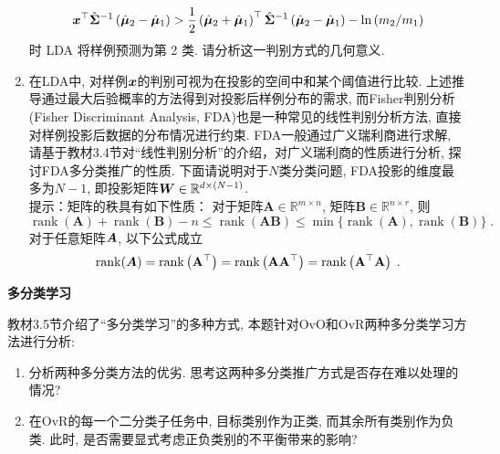 \documentclass[answers]{exam}  %
\begin{document}
\begin{questions}
\begin{enumerate}
          \begin{equation}
            {\boldsymbol{x}}^{\top} \hat{\boldsymbol{\Sigma}}^{-1}\left(\hat{\boldsymbol{\mu}}_{2}-\hat{\boldsymbol{\mu}}_{1}\right)>\frac{1}{2}\left(\hat{\boldsymbol{\mu}}_{2}+\hat{\boldsymbol{\mu}}_{1}\right)^{\top} \hat{\boldsymbol{\Sigma}}^{-1}\left(\hat{\boldsymbol{\mu}}_{2}-\hat{\boldsymbol{\mu}}_{1}\right)-\ln \left(m_{2} / m_{1}\right)
          \end{equation}时 LDA 将样例预测为第 2 类. 请分析这一判别方式的几何意义.
    \item 在LDA中, 对样例${\boldsymbol{x}}$的判别可视为在投影的空间中和某个阈值进行比较. 上述推导通过最大后验概率的方法得到对投影后样例分布的需求, 而Fisher判别分析 (Fisher Discriminant Analysis, FDA)也是一种常见的线性判别分析方法, 直接对样例投影后数据的分布情况进行约束.
          FDA一般通过广义瑞利商进行求解, 请基于教材3.4节对“线性判别分析”的介绍，对广义瑞利商的性质进行分析, 探讨FDA多分类推广的性质.
          下面请说明对于$N$类分类问题, FDA投影的维度最多为$N-1$, 即投影矩阵$\boldsymbol{W}\in\mathbb{R}^{d\times (N-1)}$.\\
          提示：矩阵的秩具有如下性质：
          对于矩阵$\mathbf{A}\in\mathbb{R}^{m \times n}$, 矩阵$\mathbf{B}\in\mathbb{R}^{n \times r}$, 则
          \begin{equation}
            \operatorname{rank}(\mathbf{A})+\operatorname{rank}(\mathbf{B})-n \leq \operatorname{rank}(\mathbf{A B}) \leq \min \{\operatorname{rank}(\mathbf{A}), \operatorname{rank}(\mathbf{B})\}\;.
          \end{equation}
          对于任意矩阵$\boldsymbol{A}$, 以下公式成立
          \begin{equation}
            \operatorname{rank}(\boldsymbol{A})=\operatorname{rank}\left(\mathbf{A}^{\top}\right)=\operatorname{rank}\left(\mathbf{A} \mathbf{A}^{\top}\right)=\operatorname{rank}\left(\mathbf{A}^{\top} \mathbf{A}\right)\;.
          \end{equation}
  \end{enumerate}
  \begin{solution}
  \end{solution}


  \question [20] \textbf{多分类学习}

  教材3.5节介绍了“多分类学习”的多种方式, 本题针对OvO和OvR两种多分类学习方法进行分析:
  \begin{enumerate}
    \item 分析两种多分类方法的优劣. 思考这两种多分类推广方式是否存在难以处理的情况?
    \item 在OvR的每一个二分类子任务中, 目标类别作为正类, 而其余所有类别作为负类. 此时, 是否需要显式考虑正负类别的不平衡带来的影响?
  \end{enumerate}
  \begin{solution}
  \end{solution}

\end{questions}
\end{document}
